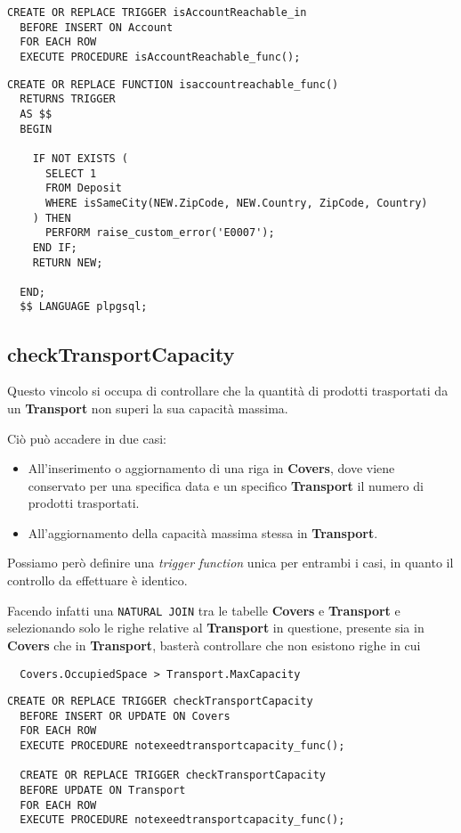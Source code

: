 \begin{lstlisting}[caption={Trigger per il vincolo \textbf{isAccountReachable}}]
  CREATE OR REPLACE TRIGGER isAccountReachable_in
  BEFORE INSERT ON Account
  FOR EACH ROW
  EXECUTE PROCEDURE isAccountReachable_func();
\end{lstlisting}

\begin{lstlisting}[caption={Funzione per il vincolo \textbf{isAccountReachable}}]
  CREATE OR REPLACE FUNCTION isaccountreachable_func()
  RETURNS TRIGGER
  AS $$
  BEGIN

    IF NOT EXISTS (
      SELECT 1
      FROM Deposit
      WHERE isSameCity(NEW.ZipCode, NEW.Country, ZipCode, Country)
    ) THEN
      PERFORM raise_custom_error('E0007');
    END IF;
    RETURN NEW;

  END;
  $$ LANGUAGE plpgsql;
\end{lstlisting}

\subsection{\textbf{checkTransportCapacity}}

Questo vincolo si occupa di controllare che la quantità di prodotti trasportati da un \textbf{Transport} non superi la sua capacità massima. 

Ciò può accadere in due casi:
\begin{itemize}
  \item All'inserimento o aggiornamento di una riga in \textbf{Covers}, dove viene conservato per una specifica data e un specifico \textbf{Transport} il numero di prodotti trasportati.
  \item All'aggiornamento della capacità massima stessa in \textbf{Transport}.
\end{itemize}

Possiamo però definire una \textit{trigger function} unica per entrambi i casi, in quanto il controllo da effettuare è identico.

Facendo infatti una \lstinline{NATURAL JOIN} tra le tabelle \textbf{Covers} e \textbf{Transport} e selezionando solo le righe relative al \textbf{Transport} in questione, presente sia in \textbf{Covers} che in \textbf{Transport}, basterà controllare che non esistono righe in cui 
\begin{lstlisting}
  Covers.OccupiedSpace > Transport.MaxCapacity
\end{lstlisting}

\begin{lstlisting}[caption={Trigger per il vincolo \textbf{checkTransportCapacity}}]
  CREATE OR REPLACE TRIGGER checkTransportCapacity
  BEFORE INSERT OR UPDATE ON Covers
  FOR EACH ROW
  EXECUTE PROCEDURE notexeedtransportcapacity_func();

  CREATE OR REPLACE TRIGGER checkTransportCapacity
  BEFORE UPDATE ON Transport
  FOR EACH ROW
  EXECUTE PROCEDURE notexeedtransportcapacity_func();
\end{lstlisting}

